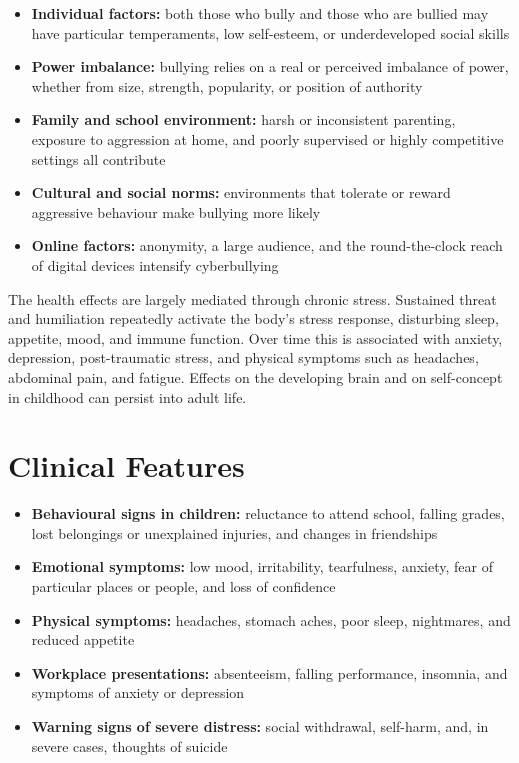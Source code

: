 \begin{itemize}
    \item \textbf{Individual factors:} both those who bully and those who are bullied may have particular temperaments, low self-esteem, or underdeveloped social skills
    \item \textbf{Power imbalance:} bullying relies on a real or perceived imbalance of power, whether from size, strength, popularity, or position of authority
    \item \textbf{Family and school environment:} harsh or inconsistent parenting, exposure to aggression at home, and poorly supervised or highly competitive settings all contribute
    \item \textbf{Cultural and social norms:} environments that tolerate or reward aggressive behaviour make bullying more likely
    \item \textbf{Online factors:} anonymity, a large audience, and the round-the-clock reach of digital devices intensify cyberbullying
\end{itemize}

The health effects are largely mediated through chronic stress. Sustained threat and humiliation repeatedly activate the body's stress response, disturbing sleep, appetite, mood, and immune function. Over time this is associated with anxiety, depression, post-traumatic stress, and physical symptoms such as headaches, abdominal pain, and fatigue. Effects on the developing brain and on self-concept in childhood can persist into adult life.

\section*{Clinical Features}
\begin{itemize}
    \item \textbf{Behavioural signs in children:} reluctance to attend school, falling grades, lost belongings or unexplained injuries, and changes in friendships
    \item \textbf{Emotional symptoms:} low mood, irritability, tearfulness, anxiety, fear of particular places or people, and loss of confidence
    \item \textbf{Physical symptoms:} headaches, stomach aches, poor sleep, nightmares, and reduced appetite
    \item \textbf{Workplace presentations:} absenteeism, falling performance, insomnia, and symptoms of anxiety or depression
    \item \textbf{Warning signs of severe distress:} social withdrawal, self-harm, and, in severe cases, thoughts of suicide
\end{itemize}

